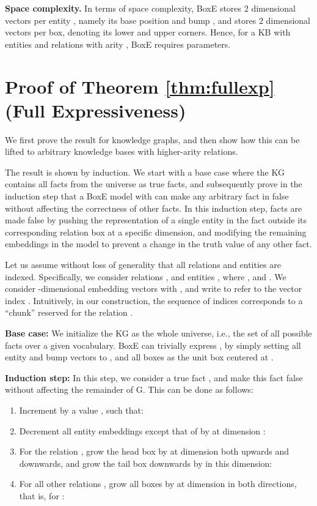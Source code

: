\documentclass{article}
\begin{document}
\textbf{Space complexity.} In terms of space complexity, BoxE stores 2 dimensional vectors per entity , namely its base position  and bump , and stores 2 dimensional vectors per box, denoting its lower and upper corners. Hence, for a KB with  entities and  relations with arity , BoxE requires  parameters.


\section{Proof of Theorem \ref{thm:fullexp} (Full Expressiveness)}
\label{app:fullExp}
We first prove the result for knowledge graphs, and then show how this can be lifted to arbitrary knowledge bases with higher-arity relations.


The result is shown by induction. We start with a base case where the KG  contains all facts from  the universe as true facts, and subsequently prove in the induction step that a BoxE model with  can make any arbitrary fact in  false without affecting the correctness of other facts. In this induction step, facts are made false by pushing the representation of a single entity in the fact outside its corresponding relation box at a specific dimension, and modifying the remaining embeddings in the model to prevent a change in the truth value of any other fact. 


Let us assume without loss of generality that all relations and entities are indexed. Specifically, we consider relations , and entities , where , and .
We consider -dimensional embedding vectors  with , and write  to refer to the vector index .
Intuitively, in our construction, the sequence of indices   corresponds to 
a ``chunk'' reserved for the relation .

\textbf{Base case: } We initialize the KG  as the whole universe, i.e., the set of all possible facts over a given vocabulary. BoxE can trivially express , by simply setting all entity and bump vectors to , and all boxes as the unit box centered at .

\textbf{Induction step: } In this step, we consider a true fact , and make this fact false without affecting the remainder of G. This can be done as follows:
\begin{enumerate}[Step 1.]
    \item Increment  by a value , such that: 
     
    \item Decrement all entity embeddings except that of  by  at dimension :
     
    \item For the relation , grow the head box by  at dimension  both upwards and downwards, and grow the tail box downwards by  in this dimension: 
    
    \item For all other relations , grow all boxes by  at dimension  in both directions, that is, for : 
    
\end{enumerate}
\end{document}
